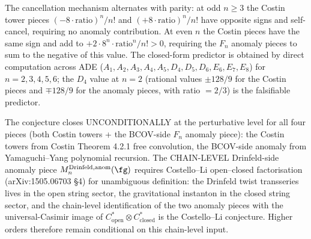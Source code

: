 \begin{remark}
\label{rem:Yfg-non-formal-higher-parity}
The cancellation mechanism alternates with parity: at odd $n \geq 3$
the Costin tower pieces $(-8 \cdot \mathrm{ratio})^n / n!$ and $(+8 \cdot
\mathrm{ratio})^n / n!$ have opposite signs and self-cancel, requiring
no anomaly contribution. At even $n$ the Costin pieces have the same
sign and add to $+2 \cdot 8^n \cdot \mathrm{ratio}^n / n! > 0$,
requiring the $F_n$ anomaly pieces to sum to the negative of this value.
The closed-form predictor is obtained by direct computation across
ADE \textup{(}$A_1, A_2, A_3, A_4, A_5, D_4, D_5, D_6, E_6, E_7,
E_8$\textup{)} for $n = 2, 3, 4, 5, 6$; the $D_4$ value at
$n = 2$ \textup{(}rational values $\pm 128/9$ for the Costin pieces
and $\mp 128/9$ for the anomaly pieces, with ratio $= 2/3$\textup{)} is
the falsifiable predictor.
\end{remark}

\begin{remark}
\label{rem:Yfg-non-formal-higher-where-it-closes}
The conjecture closes UNCONDITIONALLY at the perturbative level for
all four pieces \textup{(}both Costin towers + the BCOV-side $F_n$
anomaly piece\textup{):} the Costin towers from Costin Theorem 4.2.1
free convolution, the BCOV-side anomaly from Yamaguchi--Yang
polynomial recursion. The CHAIN-LEVEL Drinfeld-side anomaly piece
$M^{\mathrm{Drinfeld}, \mathrm{anom}}_n(\fg)$ requires Costello--Li
open--closed factorisation \textup{(}arXiv:1505.06703 \S 4\textup{)}
for unambiguous definition: the Drinfeld twist transseries lives in
the open string sector, the gravitational instanton in the closed
string sector, and the chain-level identification of the two anomaly
pieces with the universal-Casimir image of $C^*_{\mathrm{open}}
\otimes C^*_{\mathrm{closed}}$ is the Costello--Li conjecture. Higher
orders therefore remain conditional on this chain-level input.
\end{remark}

